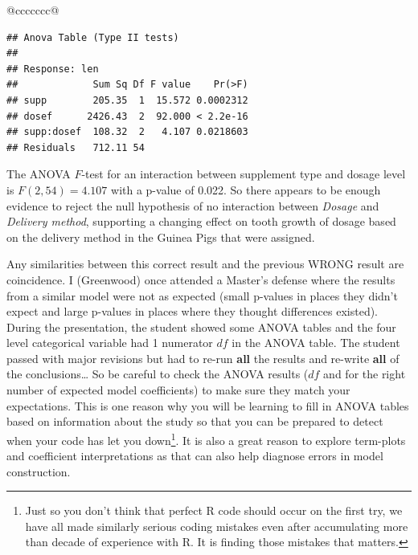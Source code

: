 \documentclass[]{book}
\newenvironment{Shaded}{\begin{snugshade}}{\end{snugshade}}
\newcommand{\KeywordTok}[1]{\textcolor[rgb]{0.13,0.29,0.53}{\textbf{#1}}}
\newcommand{\DataTypeTok}[1]{\textcolor[rgb]{0.13,0.29,0.53}{#1}}
\newcommand{\StringTok}[1]{\textcolor[rgb]{0.31,0.60,0.02}{#1}}
\newcommand{\OperatorTok}[1]{\textcolor[rgb]{0.81,0.36,0.00}{\textbf{#1}}}
\newcommand{\NormalTok}[1]{#1}
\let\rmarkdownfootnote\footnote%
\def\footnote{\protect\rmarkdownfootnote}
\theoremstyle{definition}
\theoremstyle{definition}
\theoremstyle{remark}
\begin{document}
\begin{longtable}[]{@{}ccccccc@{}}
\begin{minipage}[b]{0.10\columnwidth}
\begin{Shaded}
\begin{Highlighting}[]
\begin{Shaded}
\begin{Highlighting}[]
\begin{enumerate}
\begin{Shaded}
\end{Shaded}

\begin{verbatim}
## Anova Table (Type II tests)
## 
## Response: len
##             Sum Sq Df F value    Pr(>F)
## supp        205.35  1  15.572 0.0002312
## dosef      2426.43  2  92.000 < 2.2e-16
## supp:dosef  108.32  2   4.107 0.0218603
## Residuals   712.11 54
\end{verbatim}

The ANOVA \(F\)-test for an interaction between supplement type and
dosage level is \(F(2,54)= 4.107\) with a p-value of 0.022. So there
appears to be enough evidence to reject the null hypothesis of no
interaction between \emph{Dosage} and \emph{Delivery method}, supporting
a changing effect on tooth growth of dosage based on the delivery method
in the Guinea Pigs that were assigned.

Any similarities between this correct result and the previous WRONG
result are coincidence. I (Greenwood) once attended a Master's defense
where the results from a similar model were not as expected (small
p-values in places they didn't expect and large p-values in places where
they thought differences existed). During the presentation, the student
showed some ANOVA tables and the four level categorical variable had 1
numerator \(df\) in the ANOVA table. The student passed with major
revisions but had to re-run \textbf{all} the results and re-write
\textbf{all} of the conclusions\ldots{} So be careful to check the ANOVA
results (\(df\) and for the right number of expected model coefficients)
to make sure they match your expectations. This is one reason why you
will be learning to fill in ANOVA tables based on information about the
study so that you can be prepared to detect when your code has let you
down\footnote{Just so you don't think that perfect R code should occur
  on the first try, we have all made similarly serious coding mistakes
  even after accumulating more than decade of experience with R. It is
  finding those mistakes that matters.}. It is also a great reason to
explore term-plots and coefficient interpretations as that can also help
diagnose errors in model construction.


\end{enumerate}
\end{Highlighting}
\end{Shaded}
\end{Highlighting}
\end{Shaded}
\end{minipage}
\end{longtable}
\end{document}
